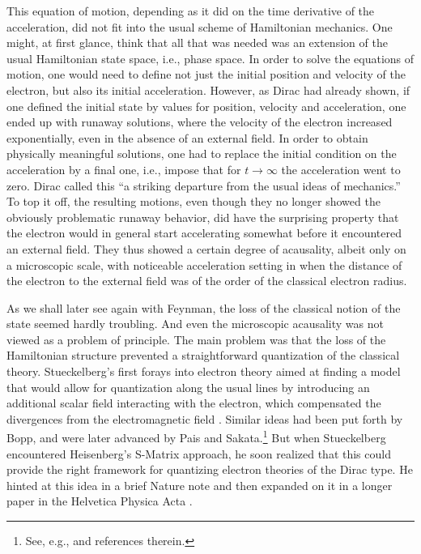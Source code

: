 \documentclass[12pt,a4paper]{article}
\begin{document}
This equation of motion, depending as it did on the time derivative of the acceleration, did not fit into the usual scheme of Hamiltonian mechanics. One might, at first glance, think that all that was needed was an extension of the usual Hamiltonian state space, i.e., phase space. In order to solve the equations of motion, one would need to define not just the initial position and velocity of the electron, but also its initial acceleration. However, as Dirac had already shown, if one defined the initial state by values for position, velocity and acceleration, one ended up with runaway solutions, where the velocity of the electron increased exponentially, even in the absence of an external field. In order to obtain physically meaningful solutions, one had to replace the initial condition on the acceleration by a final one, i.e., impose that for $t \rightarrow \infty$ the acceleration went to zero. Dirac called this ``a striking departure from the usual ideas of mechanics.'' To top it off, the resulting motions, even though they no longer showed the obviously problematic runaway behavior, did have the surprising property that the electron would in general start accelerating somewhat before it encountered an external field. They thus showed a certain degree of acausality, albeit only on a microscopic scale, with noticeable acceleration setting in when the distance of the electron to the external field was of the order of the classical electron radius.

As we shall later see again with Feynman, the loss of the classical notion of the state seemed hardly troubling. And even the microscopic acausality was not viewed as a problem of principle. The main problem was that the loss of the Hamiltonian structure prevented a straightforward quantization of the classical theory. Stueckelberg's first forays into electron theory aimed at finding a model that would allow for quantization along the usual lines by introducing an additional scalar field interacting with the electron, which compensated the divergences from the electromagnetic field      \citep{stueckelberg_1939_a-new, stueckelberg_1941_un-nouveau}. Similar ideas had been put forth by Bopp, and were later advanced by Pais and Sakata.\footnote{See, e.g., \citep{blum_2015_qed} and references therein.} But when Stueckelberg encountered Heisenberg's S-Matrix approach, he soon realized that this could provide the right framework for quantizing electron theories of the Dirac type. He hinted at this idea in a brief Nature note \citep{stueckelberg_1944_an-unambiguous} and then expanded on it in a longer paper in the Helvetica Physica Acta \citep{stueckelberg_1944_un-modele}.
\end{document}
